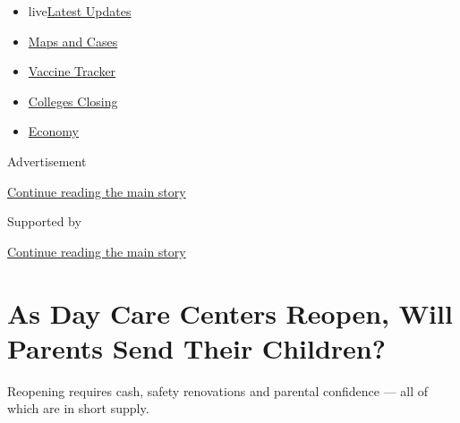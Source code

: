 \begin{itemize}
\tightlist
\item
  live\href{https://www.nytimes3xbfgragh.onion/2020/08/20/world/coronavirus-covid.html?name=styln-coronavirus-national\&region=TOP_BANNER\&variant=undefined\&block=storyline_menu_recirc\&action=click\&pgtype=Article\&impression_id=70b15601-e38f-11ea-baa5-e5648848321d}{Latest
  Updates}
\item
  \href{https://www.nytimes3xbfgragh.onion/interactive/2020/us/coronavirus-us-cases.html?name=styln-coronavirus-national\&region=TOP_BANNER\&variant=undefined\&block=storyline_menu_recirc\&action=click\&pgtype=Article\&impression_id=70b17d10-e38f-11ea-baa5-e5648848321d}{Maps
  and Cases}
\item
  \href{https://www.nytimes3xbfgragh.onion/interactive/2020/science/coronavirus-vaccine-tracker.html?name=styln-coronavirus-national\&region=TOP_BANNER\&variant=undefined\&block=storyline_menu_recirc\&action=click\&pgtype=Article\&impression_id=70b17d11-e38f-11ea-baa5-e5648848321d}{Vaccine
  Tracker}
\item
  \href{https://www.nytimes3xbfgragh.onion/2020/08/19/us/colleges-closing-covid.html?name=styln-coronavirus-national\&region=TOP_BANNER\&variant=undefined\&block=storyline_menu_recirc\&action=click\&pgtype=Article\&impression_id=70b17d12-e38f-11ea-baa5-e5648848321d}{Colleges
  Closing}
\item
  \href{https://www.nytimes3xbfgragh.onion/live/2020/08/20/business/stock-market-today-coronavirus?name=styln-coronavirus-national\&region=TOP_BANNER\&variant=undefined\&block=storyline_menu_recirc\&action=click\&pgtype=Article\&impression_id=70b17d13-e38f-11ea-baa5-e5648848321d}{Economy}
\end{itemize}

Advertisement

\protect\hyperlink{after-top}{Continue reading the main story}

Supported by

\protect\hyperlink{after-sponsor}{Continue reading the main story}

\hypertarget{as-day-care-centers-reopen-will-parents-send-their-children}{%
\section{As Day Care Centers Reopen, Will Parents Send Their
Children?}\label{as-day-care-centers-reopen-will-parents-send-their-children}}

Reopening requires cash, safety renovations and parental confidence ---
all of which are in short supply.

